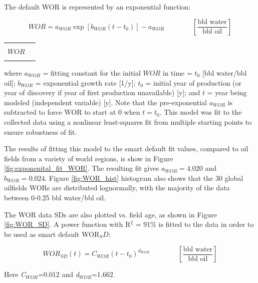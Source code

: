\documentclass[11pt]{report}
\newcommand{\xlname}[1]{\raisebox{1pt}{\fcolorbox{light-gray}{light-gray}{\texttt{\textcolor{stanford}{\scriptsize{#1}}}}}}
\newcommand{\eqnunitfrac}[2]{\quad\quad \scriptstyle{\left[\frac{\text{#1}}{\text{#2}}\right]}}
\begin{document}
The default WOR is represented by an exponential function:

\begin{minipage}{0.8\columnwidth}\label{eq:smart_default_WOR}
\begin{fleqn}[0pt]
\begin{equation}
WOR = a_{WOR} \exp [b_{WOR} ( t - t_0 )] - a_{WOR} \quad\quad\eqnunitfrac{bbl water}{bbl oil}
\end{equation}
\end{fleqn}
\end{minipage}\hfill
\begin{minipage}{0.3\columnwidth}
        \begin{tabular}{|cl}
        & \\
        $WOR$   & \xlname{WOR}\\
        & \\
\end{tabular}
\end{minipage}
where $a_{WOR}$ = fitting constant for the initial $WOR$ in time = $t_0$ [bbl water/bbl oil]; $b_{WOR}$ = exponential growth rate [1/y]; $t_0$ = initial year of production (or year of discovery if year of first production unavailable) [y]; and $t$ = year being modeled (independent variable) [y]. Note that the pre-exponential $a_{WOR}$ is subtracted to force WOR to start at 0 when $t = t_0$. This model was fit to the collected data using a nonlinear least-squares fit from multiple starting points to ensure robustness of fit.

The results of fitting this model to the smart default fit values, compared to oil fields from a variety of world regions, is show in Figure \ref{fig:exponenital_fit_WOR}. The resulting fit gives $a_{WOR} = 4.020$ and $b_{WOR} = 0.024$. Figure \ref{fig:WOR_hist} histogram also shows that the 30 global oilfields WORs are distributed lognormally, with the majority of the data between 0-0.25 bbl water/bbl oil. 

The WOR data SDs are also plotted vs. field age, as shown in Figure \ref{fig:WOR_SD}. A power function with R$^2$ = 91\% is fitted to the data in order to be used as smart default WOR$_SD$:

\begin{equation}\label{eq:smart_default_WOR_STDV}
WOR_{SD}(t) = C_{WOR}( t - t_0 )^{d_{WOR}} \quad\quad\eqnunitfrac{bbl water}{bbl oil}
\end{equation}

Here \emph{C$_{WOR}$}=0.012 and \emph{d$_{WOR}$}=1.662. 
\end{document}
